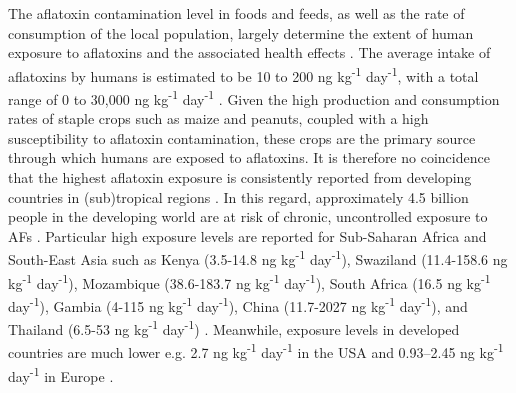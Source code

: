 The aflatoxin contamination level in foods and feeds, as well as the rate of consumption of the local population, largely determine the extent of human exposure to aflatoxins and the associated health effects \citep{jallow2021worldwide}. The average intake of aflatoxins by humans is estimated to be 10 to 200 ng kg\textsuperscript{-1} day\textsuperscript{-1}, with a total range of 0 to 30,000 ng kg\textsuperscript{-1} day\textsuperscript{-1} \citep{kaplan2003clinical, gong2016aflatoxin}. Given the high production and consumption rates of staple crops such as maize and peanuts, coupled with a high susceptibility to aflatoxin contamination, these crops are the primary source through which humans are exposed to aflatoxins. It is therefore no coincidence that the highest aflatoxin exposure is consistently reported from developing countries in (sub)tropical regions \citep{jallow2021worldwide}. In this regard, approximately 4.5 billion people in the developing world are at risk of chronic, uncontrolled exposure to AFs \citep{williams2004human, rushing2019aflatoxin, shephard2003aflatoxin, williams2004human}. Particular high exposure levels are reported for Sub-Saharan Africa and South-East Asia \citep{gong2016aflatoxin} such as Kenya (3.5-14.8 ng kg\textsuperscript{-1} day\textsuperscript{-1}), Swaziland (11.4-158.6 ng kg\textsuperscript{-1} day\textsuperscript{-1}), Mozambique (38.6-183.7 ng kg\textsuperscript{-1} day\textsuperscript{-1}), South Africa (16.5 ng kg\textsuperscript{-1} day\textsuperscript{-1}), Gambia (4-115 ng kg\textsuperscript{-1} day\textsuperscript{-1}), China (11.7-2027 ng kg\textsuperscript{-1} day\textsuperscript{-1}), and Thailand (6.5-53 ng kg\textsuperscript{-1} day\textsuperscript{-1}) \citep{williams2004human}. Meanwhile, exposure levels in developed countries are much lower e.g. 2.7 ng kg\textsuperscript{-1} day\textsuperscript{-1} in the USA \citep{williams2004human} and 0.93–2.45 ng kg\textsuperscript{-1} day\textsuperscript{-1} in Europe \citep{jecfa2008sixty}.


